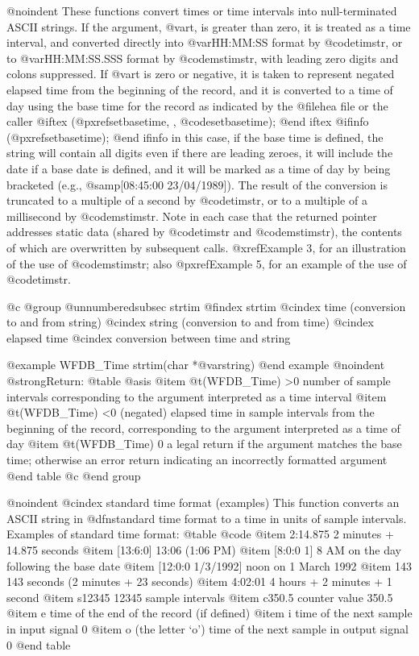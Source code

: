 {{{{{{{{{@noindent
These functions convert times or time intervals into null-terminated
ASCII strings.  If the argument, @var{t}, is greater than zero, it is
treated as a time interval, and converted directly into @var{HH:MM:SS}
format by @code{timstr}, or to @var{HH:MM:SS.SSS} format by
@code{mstimstr}, with leading zero digits and colons suppressed.  If
@var{t} is zero or negative, it is taken to represent negated elapsed
time from the beginning of the record, and it is converted to a time of
day using the base time for the record as indicated by the @file{hea}
file or the caller
@iftex
(@pxref{setbasetime, , @code{setbasetime}});
@end iftex
@ifinfo
(@pxref{setbasetime});
@end ifinfo
in this case, if the base time is defined, the string will contain all
digits even if there are leading zeroes, it will include the date if a
base date is defined, and it will be marked as a time of day by being
bracketed (e.g., @samp{[08:45:00 23/04/1989]}).  The result of the
conversion is truncated to a multiple of a second by @code{timstr}, or
to a multiple of a millisecond by @code{mstimstr}.  Note in each case
that the returned pointer addresses static data (shared by @code{timstr}
and @code{mstimstr}), the contents of which are overwritten by
subsequent calls.  @xref{Example 3}, for an illustration of the use of
@code{mstimstr}; also @pxref{Example 5}, for an example of the use of
@code{timstr}.

@c @group
@unnumberedsubsec strtim
@findex strtim
@cindex time (conversion to and from string)
@cindex string (conversion to and from time)
@cindex elapsed time
@cindex conversion between time and string

@example
WFDB_Time strtim(char *@var{string})
@end example
@noindent
@strong{Return:}
@table @asis
@item @t{(WFDB_Time) >0}
number of sample intervals corresponding to the argument interpreted as
a time interval
@item @t{(WFDB_Time) <0}
(negated) elapsed time in sample intervals from the beginning of the record,
corresponding to the argument interpreted as a time of day
@item @t{(WFDB_Time)  0}
a legal return if the argument matches the base time;  otherwise an error
return indicating an incorrectly formatted argument
@end table
@c @end group

@noindent
@cindex standard time format (examples)
This function converts an ASCII string in @dfn{standard time format} to a time
in units of sample intervals.  Examples of standard time format:
@table @code
@item 2:14.875
2 minutes + 14.875 seconds
@item [13:6:0]
13:06 (1:06 PM)
@item [8:0:0 1]
8 AM on the day following the base date
@item [12:0:0 1/3/1992]
noon on 1 March 1992
@item 143
143 seconds (2 minutes + 23 seconds)
@item 4:02:01
4 hours + 2 minutes + 1 second
@item s12345
12345 sample intervals
@item c350.5
counter value 350.5
@item e
time of the end of the record (if defined)
@item i
time of the next sample in input signal 0
@item o
(the letter `o') time of the next sample in output signal 0
@end table

}}}}}}}}}
